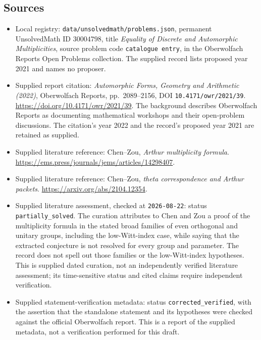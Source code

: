 \documentclass[11pt]{article}
\begin{document}
\subsection{Sources}
\begin{itemize}
\item Local registry: \texttt{data/unsolvedmath/problems.json}, permanent UnsolvedMath ID \(30004798\), title \emph{Equality of Discrete and Automorphic Multiplicities}, source problem code \texttt{catalogue entry}, in the Oberwolfach Reports Open Problems collection. The supplied record lists proposed year 2021 and names no proposer.
\item Supplied report citation: \emph{Automorphic Forms, Geometry and Arithmetic (2022)}, Oberwolfach Reports, pp.~2089--2156, DOI \texttt{10.4171/owr/2021/39}. \url{https://doi.org/10.4171/owr/2021/39}. The background describes Oberwolfach Reports as documenting mathematical workshops and their open-problem discussions. The citation's year 2022 and the record's proposed year 2021 are retained as supplied.
\item Supplied literature reference: Chen--Zou, \emph{Arthur multiplicity formula}. \url{https://ems.press/journals/jems/articles/14298407}.
\item Supplied literature reference: Chen--Zou, \emph{theta correspondence and Arthur packets}. \url{https://arxiv.org/abs/2104.12354}.
\item Supplied literature assessment, checked at \texttt{2026-08-22}: status \texttt{partially\_solved}. The curation attributes to Chen and Zou a proof of the multiplicity formula in the stated broad families of even orthogonal and unitary groups, including the low-Witt-index case, while saying that the extracted conjecture is not resolved for every group and parameter. The record does not spell out those families or the low-Witt-index hypotheses. This is supplied dated curation, not an independently verified literature assessment; its time-sensitive status and cited claims require independent verification.
\item Supplied statement-verification metadata: status \texttt{corrected\_verified}, with the assertion that the standalone statement and its hypotheses were checked against the official Oberwolfach report. This is a report of the supplied metadata, not a verification performed for this draft.
\end{itemize}
\end{document}
